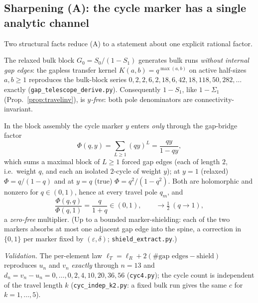 \subsection{Sharpening (A): the cycle marker has a single analytic channel}
\label{ss:gapbridge}

Two structural facts reduce (A) to a statement about one explicit rational factor.

\begin{lemma}\label{lem:gapless}
The relaxed bulk block $G_0=S_0/(1-S_1)$ generates bulk runs \emph{without internal
gap edges}: the gapless transfer kernel $K(a,b)=q^{\max(a,b)}$ on active half-sizes
$a,b\ge1$ reproduces the bulk-block series $0,2,2,6,2,18,6,42,18,118,50,282,\dots$
exactly \textup(\texttt{gap\_telescope\_derive.py}\textup). Consequently $1-S_1$,
like $1-\Sigma_1$ \textup(Prop.~\ref{prop:travelinv}\textup), is \emph{$y$-free}:
both pole denominators are connectivity-invariant.
\end{lemma}

\begin{lemma}\label{lem:bridge}
In the block assembly the cycle marker $y$ enters \emph{only} through the
gap-bridge factor
\[
  \Phi(q,y)=\sum_{L\ge1}(qy)^{L}=\frac{qy}{1-qy},
\]
which sums a maximal block of $L\ge1$ forced gap edges (each of length $2$, i.e.\
weight $q$, and each an isolated $2$-cycle of weight $y$); at $y=1$ \textup(relaxed\textup)
$\Phi=q/(1-q)$ and at $y=q$ \textup(true\textup) $\Phi=q^{2}/(1-q^{2})$. Both are
holomorphic and nonzero for $q\in(0,1)$, hence at every travel pole $q_m$, and
\[
  \frac{\Phi(q,q)}{\Phi(q,1)}=\frac{q}{1+q}\in(0,1),\qquad \to\tfrac12\ (q\to1),
\]
a \emph{zero-free} multiplier. \textup(Up to a bounded marker-shielding: each of the
two markers absorbs at most one adjacent gap edge into the spine, a correction in
$\{0,1\}$ per marker fixed by $(\varepsilon,\delta)$; \texttt{shield\_extract.py}.\textup)
\end{lemma}

\noindent\emph{Validation.} The per-element law $\ell_T=\ell_R+2(\#\text{gap edges}-\text{shield})$
reproduces $u_n$ and $v_n$ \emph{exactly} through $n=13$ and $d_n=v_n-u_n=
0,\dots,0,2,4,10,20,36,56$ \textup(\texttt{cyc4.py}\textup); the cycle count is
independent of the travel length $k$ \textup(\texttt{cyc\_indep\_k2.py}: a fixed bulk
run gives the same $c$ for $k=1,\dots,5$\textup).

